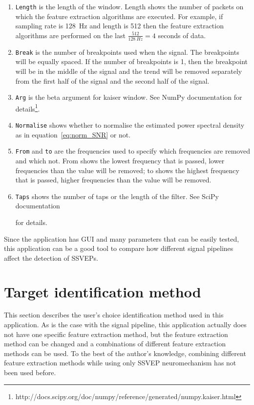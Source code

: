 \begin{enumerate}
	\item \texttt{Length} is the length of the window. Length shows the number of packets on which the \gls{feature extraction} algorithms are executed. For example, if \gls{sampling rate} is \SI{128}{Hz} and length is 512 then the \gls{feature extraction} algorithms are performed on the last $\frac{512}{\SI{128}{Hz}}=4$ seconds of data.
	\item \texttt{Break} is the number of breakpoints used when  the signal. The breakpoints will be equally spaced. If the number of breakpoints is 1, then the breakpoint will be in the middle of the signal and the trend will be removed separately from the first half of the signal and the second half of the signal.
	\item \texttt{Arg} is the beta argument for kaiser window. See NumPy documentation for details\footnote{http://docs.scipy.org/doc/numpy/reference/generated/numpy.kaiser.html}.
	\item \texttt{Normalise} shows whether to normalise the estimated \gls{power spectral density} as in equation~\ref{eq:norm_SNR} or not.
	\item \texttt{From} and \texttt{to} are the frequencies used to specify which frequencies are removed and which not. From shows the lowest frequency that is passed, lower frequencies than the value will be removed; to shows the highest frequency that is passed, higher frequencies than the value will be removed.
	\item \texttt{Taps} shows the number of taps or the length of the filter. See SciPy documentation\addtocounter{footnote}{-2}\footnotemark\addtocounter{footnote}{1} for details.
\end{enumerate}

Since the application has \gls{GUI} and many parameters that can be easily tested, this application can be a good tool to compare how different signal pipelines affect the detection of \glspl{SSVEP}.

\section{Target identification method}
\label{sec:identification}

This section describes the user's choice identification method used in this application. As is the case with the signal pipeline, this application actually does not have one specific \gls{feature extraction} method, but the \gls{feature extraction} method can be changed and a combinations of different \gls{feature extraction} methods can be used. To the best of the author's knowledge, combining different \gls{feature extraction} methods while using only \gls{SSVEP} neuromechanism has not been used before.

